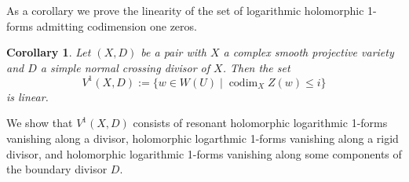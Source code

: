 \documentclass[a4paper,12pt,reqno]{amsart}
\theoremstyle{plain}
\newtheorem{corollary}[theorem]{Corollary}
\theoremstyle{definition}
\theoremstyle{remark}
\newcommand{\codim}{\operatorname{codim}}
\begin{document}
As a corollary we prove the linearity of the set of logarithmic holomorphic 1-forms admitting codimension one zeros.

\begin{corollary}
Let $(X, D)$ be a pair with $X$ a complex smooth projective variety and $D$ a simple normal crossing divisor of $X$. Then the set $$ V^1(X,D):=\{ w \in W(U) \mid \codim_X Z(w) \leq i \}$$ is linear.
\end{corollary}

We show that $V^1(X,D)$ consists of resonant holomorphic logarithmic 1-forms vanishing along a divisor, holomorphic logarthmic 1-forms vanishing along a rigid divisor, and holomorphic logarithmic 1-forms vanishing along some components of the boundary divisor $D$.




 
\end{document}
